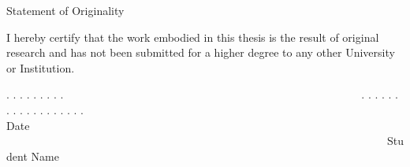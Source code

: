 \thispagestyle{empty}



\begin{center}
	\large{Statement of Originality}
\end{center}


I hereby certify that the work embodied in this thesis is the result of original research and has not been submitted for a higher degree to any other University or Institution.


\vfill

\begin{center}
	. . . . . . . . .~~~~~~~~~~~~~~~~~~~~~~~~~~~~~~~~~~~~~~~~~~~~~~~~~~~~~~. . . . . . . . . . . . . . . . . .\\
	Date ~~~~~~~~~~~~~~~~~~~~~~~~~~~~~~~~~~~~~~~~~~~~~~~~~~~~~~~~~~~~~~~~~~~~~Student Name
\end{center}

\vspace{16em}

\forcedoublepage
